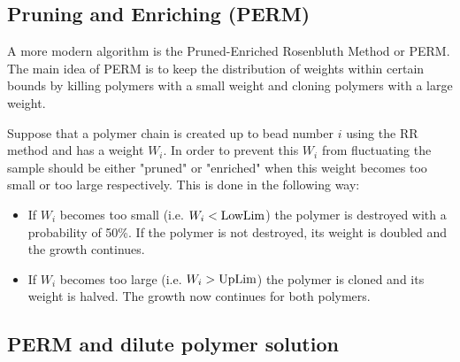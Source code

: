 \subsection*{Pruning and Enriching (PERM)}
A more modern algorithm is the Pruned-Enriched Rosenbluth Method or PERM. The main idea of PERM is to keep the distribution of weights within certain bounds by killing polymers with a small weight and cloning polymers with a large weight.

Suppose that a polymer chain is created up to bead number $i$ using the RR method and has a weight $W_i$. In order to prevent this $W_i$ from fluctuating the sample should be either "pruned" or "enriched" when this weight becomes too small or too large respectively. This is done in the following way:

\begin{itemize}
  \item If $W_i$ becomes too small (i.e. $W_i < \textup{LowLim}$) the polymer is destroyed with a probability of 50\%. If the polymer is not destroyed, its weight is doubled and the growth continues.
  \item If $W_i$ becomes too large (i.e. $W_i > \textup{UpLim}$) the polymer is cloned and its weight is halved. The growth now continues for both polymers.
\end{itemize}

\subsection*{PERM and dilute polymer solution}